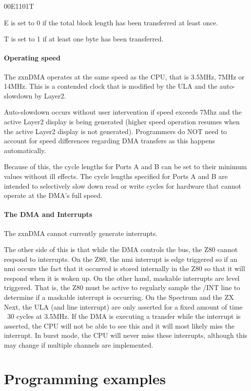 \begin{multicols}{2}
00E1101T

E is set to 0 if the total block length has been transferred
at least once.

T is set to 1 if at least one byte has been transferred.
\einset

\paragraph{Operating speed}

The zxnDMA operates at the same speed as the CPU, that is 3.5MHz, 7MHz
or 14MHz. This is a contended clock that is modified by the ULA and
the auto-slowdown by Layer2.

Auto-slowdown occurs without user intervention if speed exceeds 7Mhz
and the active Layer2 display is being generated (higher speed
operation resumes when the active Layer2 display is not
generated). Programmers do NOT need to account for speed differences
regarding DMA transfers as this happens automatically.

Because of this, the cycle lengths for Ports A and B can be set to
their minimum values without ill effects. The cycle lengths specified
for Ports A and B are intended to selectively slow down read or write
cycles for hardware that cannot operate at the DMA's full speed.

\paragraph{The DMA and Interrupts}

The zxnDMA cannot currently generate interrupts.

The other side of this is that while the DMA controls the bus, the Z80
cannot respond to interrupts. On the Z80, the nmi interrupt is edge
triggered so if an nmi occurs the fact that it occurred is stored
internally in the Z80 so that it will respond when it is woken up. On
the other hand, maskable interrupts are level triggered. That is, the
Z80 must be active to regularly sample the /INT line to determine if a
maskable interrupt is occurring. On the Spectrum and the ZX Next, the
ULA (and line interrupt) are only asserted for a fixed amount of time
~30 cycles at 3.5MHz. If the DMA is executing a transfer while the
interrupt is asserted, the CPU will not be able to see this and it
will most likely miss the interrupt. In burst mode, the CPU will never
miss these interrupts, although this may change if multiple channels
are implemented.

\section{Programming examples}


\end{multicols}
